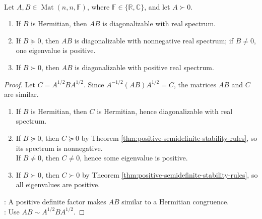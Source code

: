 \begin{corollary} \label{cor:positive-definite-hermitian-product-spectrum} \\
Let $A,B\in\operatorname{Mat}(n,n,\mathbb{F})$, where $\mathbb{F}\in\{\mathbb{R},\mathbb{C}\}$, and let $A\succ0$.
\begin{enumerate}[label=(\roman*)]
\setlength{\itemsep}{0pt}
\item If $B$ is Hermitian, then $AB$ is diagonalizable with real spectrum.
\item If $B\succeq0$, then $AB$ is diagonalizable with nonnegative real spectrum; if $B\neq0$, one eigenvalue is positive.
\item If $B\succ0$, then $AB$ is diagonalizable with positive real spectrum.
\end{enumerate}
\begin{proof}
Let $C=A^{1/2}BA^{1/2}$. Since $A^{-1/2}(AB)A^{1/2}=C$, the matrices $AB$ and $C$ are similar.
\begin{enumerate}[label=(\roman*)]
\setlength{\itemsep}{0pt}
\item If $B$ is Hermitian, then $C$ is Hermitian, hence diagonalizable with real spectrum.
\item If $B\succeq0$, then $C\succeq0$ by Theorem \ref{thm:positive-semidefinite-stability-rules}, so its spectrum is nonnegative.\\
If $B\neq0$, then $C\neq0$, hence some eigenvalue is positive.
\item If $B\succ0$, then $C\succ0$ by Theorem \ref{thm:positive-semidefinite-stability-rules}, so all eigenvalues are positive.
\end{enumerate}
: A positive definite factor makes $AB$ similar to a Hermitian congruence.\\
: Use $AB\sim A^{1/2}BA^{1/2}$.
\end{proof}
\end{corollary}

